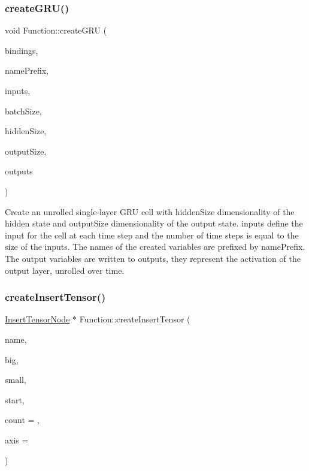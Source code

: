 \subsubsection{\texorpdfstring{create\+G\+R\+U()}{createGRU()}}
{\footnotesize\ttfamily void Function\+::create\+G\+RU (\begin{DoxyParamCaption}\item[{\hyperlink{classglow_1_1_placeholder_bindings}{Placeholder\+Bindings} \&}]{bindings,  }\item[{llvm\+::\+String\+Ref}]{name\+Prefix,  }\item[{const llvm\+::\+Array\+Ref$<$ \hyperlink{structglow_1_1_node_value}{Node\+Value} $>$}]{inputs,  }\item[{unsigned}]{batch\+Size,  }\item[{unsigned}]{hidden\+Size,  }\item[{unsigned}]{output\+Size,  }\item[{std\+::vector$<$ \hyperlink{structglow_1_1_node_value}{Node\+Value} $>$ \&}]{outputs }\end{DoxyParamCaption})}

Create an unrolled single-\/layer G\+RU cell with {\ttfamily hidden\+Size} dimensionality of the hidden state and {\ttfamily output\+Size} dimensionality of the output state. {\ttfamily inputs} define the input for the cell at each time step and the number of time steps is equal to the size of the {\ttfamily inputs}. The names of the created variables are prefixed by {\ttfamily name\+Prefix}. The output variables are written to {\ttfamily outputs}, they represent the activation of the output layer, unrolled over time. \mbox{\label{classglow_1_1_function_aeacd10cc5da0f12caa196897ce7a6141}} 
\subsubsection{\texorpdfstring{create\+Insert\+Tensor()}{createInsertTensor()}}
{\footnotesize\ttfamily \hyperlink{classglow_1_1_insert_tensor_node}{Insert\+Tensor\+Node} $\ast$ Function\+::create\+Insert\+Tensor (\begin{DoxyParamCaption}\item[{llvm\+::\+String\+Ref}]{name,  }\item[{\hyperlink{structglow_1_1_node_value}{Node\+Value}}]{big,  }\item[{\hyperlink{structglow_1_1_node_value}{Node\+Value}}]{small,  }\item[{llvm\+::\+Array\+Ref$<$ size\+\_\+t $>$}]{start,  }\item[{\hyperlink{namespaceglow_a0ca574644e1e42ef193a9947fb4d8911}{unsigned\+\_\+t}}]{count = {},  }\item[{\hyperlink{namespaceglow_a0ca574644e1e42ef193a9947fb4d8911}{unsigned\+\_\+t}}]{axis = {} }\end{DoxyParamCaption})}

